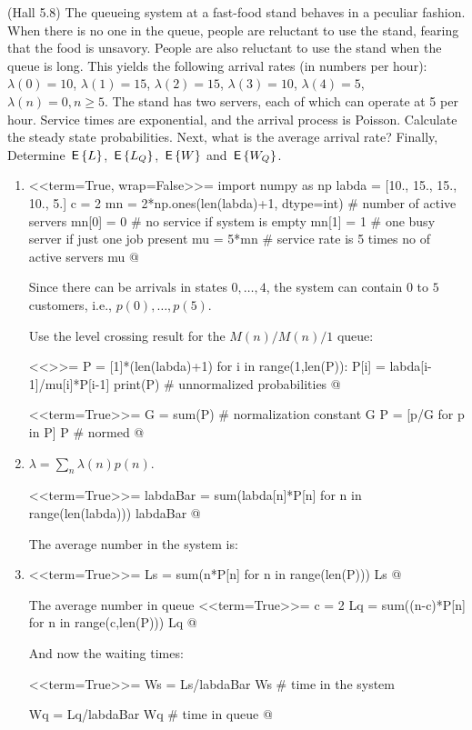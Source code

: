 \begin{exercise}
  (Hall 5.8) The queueing system at a fast-food stand behaves in a
  peculiar fashion. When there is no one in the queue, people are
  reluctant to use the stand, fearing that the food is
  unsavory. People are also reluctant to use the stand when the queue
  is long. This yields the following arrival rates (in numbers per hour): $\lambda(0) = 10$, $\lambda(1)=15$, $\lambda(2)=15$, $\lambda(3)=10$, $\lambda(4)=5$, $\lambda(n)=0, n\geq 5$. The stand has two servers, each of which can operate at 5 per hour. Service times are exponential, and the arrival process is Poisson.
 Calculate the steady state probabilities. Next,  what is the average arrival rate? Finally,
 Determine $\,\mathsf{E}\left\{L\right\}$, $\,\mathsf{E}\left\{L_Q\right\}$, $\,\mathsf{E}\left\{W\right\}$ and $\,\mathsf{E}\left\{W_Q\right\}$.
  \begin{solution}
      \begin{enumerate}
      \item 

<<term=True, wrap=False>>=
import numpy as np
labda = [10., 15., 15., 10., 5.]
c = 2
mn = 2*np.ones(len(labda)+1, dtype=int)  # number of active servers
mn[0] = 0  # no service if system is empty
mn[1] = 1  # one busy server if just one job present
mu = 5*mn # service rate is 5 times no of active servers
mu
@

Since there can be arrivals in states $0,\ldots, 4$,  the system can contain $0$ to $5$ customers, i.e., $p(0),\ldots, p(5)$.

Use the level crossing result for the $M(n)/M(n)/1$ queue:

<<>>=
P = [1]*(len(labda)+1)
for i in range(1,len(P)):
    P[i] = labda[i-1]/mu[i]*P[i-1]
print(P) # unnormalized probabilities
@

<<term=True>>=
G = sum(P) # normalization constant
G
P = [p/G for p in P]
P # normed
@ 

\item 

$\lambda = \sum_{n}\lambda(n) p(n)$.

<<term=True>>=
labdaBar = sum(labda[n]*P[n] for n in range(len(labda)))
labdaBar
@


The average number in the system is: 
\item 
<<term=True>>=
Ls = sum(n*P[n] for n in range(len(P)))
Ls
@


The average number in queue 
<<term=True>>=
c = 2
Lq = sum((n-c)*P[n] for n in range(c,len(P)))
Lq
@ 

And now the waiting times:

<<term=True>>=
Ws = Ls/labdaBar
Ws # time in the system

Wq = Lq/labdaBar
Wq # time in queue
@ 

  \end{enumerate}
    \end{solution}
\end{exercise}

